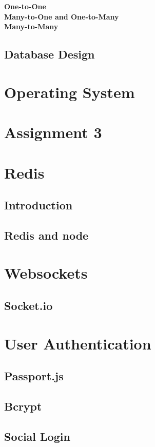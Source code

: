 \documentclass[a4paper]{article}
\begin{document}
\textbf{One-to-One}\\

\textbf{Many-to-One and One-to-Many}\\

\textbf{Many-to-Many}\\


\subsection{Database Design}

\section{Operating System}

\section{Assignment 3}

\section{Redis}
\subsection{Introduction}
\subsection{Redis and node}

\section{Websockets}
\subsection{Socket.io}

\section{User Authentication}
\subsection{Passport.js}
\subsection{Bcrypt}
\subsection{Social Login}
\end{document}
